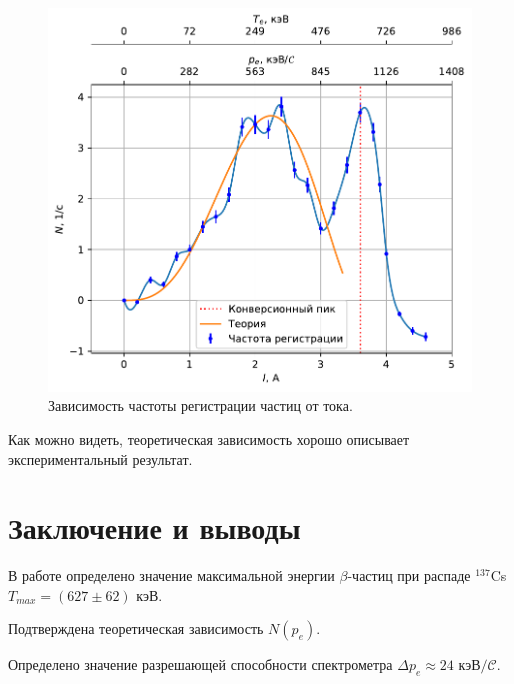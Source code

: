 \documentclass[a4paper, 12pt]{article} %
\begin{document}
	\begin{figure}[h!]
		\centering
		\includegraphics[width=0.7\linewidth]{gen/spectrum_fermi.pdf}
		\caption{Зависимость частоты регистрации частиц от тока.}
		\label{fig:th_spectrum}
	\end{figure}
	
	Как можно видеть, теоретическая зависимость хорошо описывает экспериментальный результат.

\newpage

\section{Заключение и выводы}
	
	В работе определено значение максимальной энергии $\beta$-частиц при распаде $^{137}$Cs $T_{max} = (627 \pm 62)$ кэВ.
	
	Подтверждена теоретическая зависимость $N(p_e)$.
	
	Определено значение разрешающей способности спектрометра $\Delta p_e \approx 24 \text{ кэВ}/{\mathcal{C}}$.
		
\end{document}
